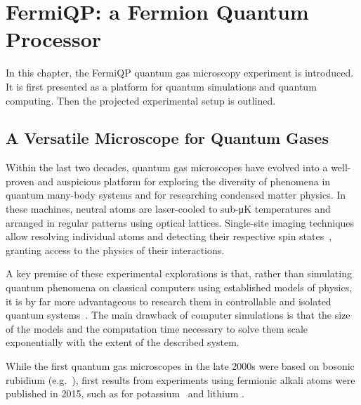 \renewcommand{\imagepath}{../20-fermiqp/img}

\chapter{FermiQP: a Fermion Quantum Processor}
In this chapter, the FermiQP quantum gas microscopy experiment is introduced. It is first presented as a platform for quantum simulations and quantum computing. Then the projected experimental setup is outlined.

\section{A Versatile Microscope for Quantum Gases}\label{ch:quantum_gas_microscopy}
Within the last two decades, quantum gas microscopes have evolved into a well-proven and auspicious platform for exploring the diversity of phenomena in quantum many-body systems and for researching condensed matter physics. In these machines, neutral atoms are laser-cooled to sub-\si[]{\micro\kelvin} temperatures and arranged in regular patterns using optical lattices. Single-site imaging techniques allow resolving individual atoms and detecting their respective spin states~\cite{bloch_many-body_2008,gross_quantum_2017, gross_quantum_2021}, granting access to the physics of their interactions.

A key premise of these experimental explorations is that, rather than simulating quantum phenomena on classical computers using established models of physics, it is by far more advantageous to research them in controllable and isolated quantum systems~\cite{feynman_simulating_1982}. The main drawback of computer simulations is that the size of the models and the computation time necessary to solve them scale exponentially with the extent of the described system.

While the first quantum gas microscopes in the late 2000s were based on bosonic rubidium (e.g.~\cite{sherson_single-atom-resolved_2010}), first results from experiments using fermionic alkali atoms were published in 2015, such as for potassium~\cite{cheuk_quantum-gas_2015} and lithium \cite{parsons_site-resolved_2015, omran_microscopic_2015}.

